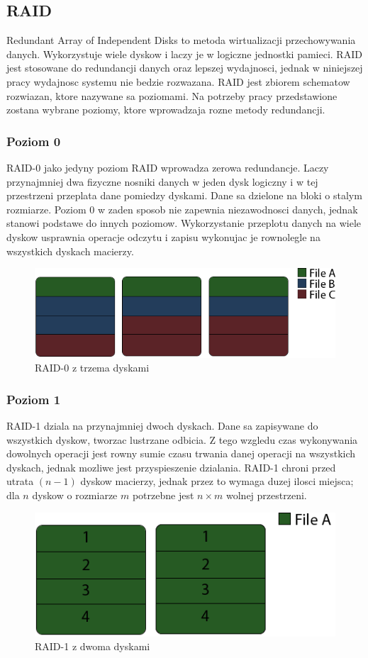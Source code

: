 \subsection {RAID}
Redundant Array of Independent Disks to metoda wirtualizacji przechowywania danych. Wykorzystuje wiele dyskow i laczy je w logiczne jednostki pamieci. RAID jest stosowane do redundancji danych oraz lepszej wydajnosci, jednak w niniejszej pracy wydajnosc systemu nie bedzie rozwazana.  
RAID jest zbiorem schematow rozwiazan, ktore nazywane sa poziomami. Na potrzeby pracy przedstawione zostana wybrane poziomy, ktore wprowadzaja rozne metody redundancji.
\subsubsection{Poziom 0}
RAID-0 jako jedyny poziom RAID wprowadza zerowa redundancje. Laczy przynajmniej dwa fizyczne nosniki danych w jeden dysk logiczny i w tej przestrzeni przeplata dane pomiedzy dyskami. Dane sa dzielone na bloki o stalym rozmiarze. Poziom 0 w zaden sposob nie zapewnia niezawodnosci danych, jednak stanowi podstawe do innych poziomow. Wykorzystanie przeplotu danych na wiele dyskow usprawnia operacje odczytu i zapisu wykonujac je rownolegle na wszystkich dyskach macierzy.
\begin{figure}[h!]
        \centering
        \includegraphics{raid-0.png}
        \caption{RAID-0 z trzema dyskami}
        \label{fig:raid0}
\end{figure}
\subsubsection{Poziom 1}
RAID-1 dziala na przynajmniej dwoch dyskach. Dane sa zapisywane do wszystkich dyskow, tworzac lustrzane odbicia. Z tego wzgledu czas wykonywania dowolnych operacji jest rowny sumie czasu trwania danej operacji na wszystkich dyskach, jednak mozliwe jest przyspieszenie dzialania. RAID-1 chroni przed utrata $(n-1)$ dyskow macierzy, jednak przez to wymaga duzej ilosci miejsca; dla $n$ dyskow o rozmiarze $m$ potrzebne jest $n\times m$ wolnej przestrzeni.
\begin{figure}[h!]
        \centering
        \includegraphics{raid-1.png}
        \caption{RAID-1 z dwoma dyskami}
        \label{fig:raid1}
\end{figure}
